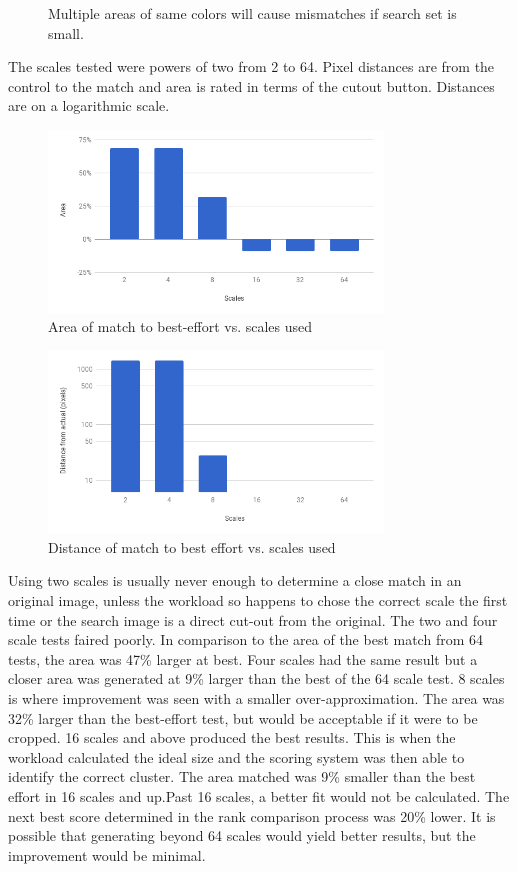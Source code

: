 \documentclass[10pt, journal]{vgtc}                %
\newcommand\tab[1][1cm]{\hspace*{#1}}
\begin{document}
\begin{flushleft}
\begin{figure}[h!]
		\caption{Multiple areas of same colors will cause mismatches if search set is small.}
	\end{figure}
	\tab The scales tested were powers of two from 2 to 64. Pixel distances are from the control to the match and area is rated in terms of the cutout button. Distances are on a logarithmic scale.\\\smallskip
	\begin{figure}[h!]
		\centering
		\includegraphics[width=3.5in]{area.png}
		\caption{Area of match to best-effort vs. scales used}
	\end{figure}
	\begin{figure}[h!]
		\centering
		\includegraphics[width=3.5in]{match_distance.png}
		\caption{Distance of match to best effort vs. scales used}
	\end{figure}
	\tab Using two scales is usually never enough to determine a close match in an original image, unless the workload so happens to chose the correct scale the first time or the search image is a direct cut-out from the original. The two and four scale tests faired poorly. In comparison to the area of the best match from 64 tests, the area was 47\% larger at best. Four scales had the same result but a closer area was generated at 9\% larger than the best of the 64 scale test. 8 scales is where improvement was seen with a smaller over-approximation. The area was 32\% larger than the best-effort test, but would be acceptable if it were to be cropped. 16 scales and above produced the best results. This is when the workload calculated the ideal size and the scoring system was then able to identify the correct cluster. The area matched was 9\% smaller than the best effort in 16 scales and up.Past 16 scales, a better fit would not be calculated. The next best score determined in the rank comparison process was 20\% lower. It is possible that generating beyond 64 scales would yield better results, but the improvement would be minimal.\\

\end{flushleft}
\end{document}
